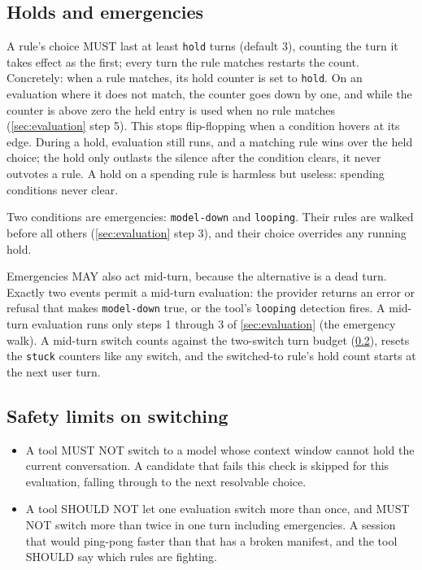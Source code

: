 \documentclass[11pt]{article}
\newcommand{\key}[1]{\texttt{#1}}
\begin{document}
\subsection{Holds and emergencies}
\label{sec:holds}

A rule's choice MUST last at least \key{hold} turns (default 3),
counting the turn it takes effect as the first; every turn the rule
matches restarts the count. Concretely: when a rule matches, its hold
counter is set to \key{hold}. On an evaluation where it does not match,
the counter goes down by one, and while the counter is above zero the
held entry is used when no rule matches (\ref{sec:evaluation} step 5).
This stops flip-flopping when a condition hovers at its edge. During a
hold, evaluation still runs, and a matching rule wins over the held
choice; the hold only outlasts the silence after the condition clears,
it never outvotes a rule. A hold on a spending rule is harmless but
useless: spending conditions never clear.

Two conditions are emergencies: \key{model-down} and \key{looping}.
Their rules are walked before all others (\ref{sec:evaluation} step 3),
and their choice overrides any running hold.

Emergencies MAY also act mid-turn, because the alternative is a dead
turn. Exactly two events permit a mid-turn evaluation: the provider
returns an error or refusal that makes \key{model-down} true, or the
tool's \key{looping} detection fires. A mid-turn evaluation runs only
steps 1 through 3 of \ref{sec:evaluation} (the emergency walk). A
mid-turn switch counts against the two-switch turn budget
(\ref{sec:safety}), resets the \key{stuck} counters like any switch,
and the switched-to rule's hold count starts at the next user turn.

\subsection{Safety limits on switching}
\label{sec:safety}

\begin{itemize}
  \item A tool MUST NOT switch to a model whose context window cannot hold
        the current conversation. A candidate that fails this check is
        skipped for this evaluation, falling through to the next resolvable
        choice.
  \item A tool SHOULD NOT let one evaluation switch more than once, and MUST
        NOT switch more than twice in one turn including emergencies. A
        session that would ping-pong faster than that has a broken manifest,
        and the tool SHOULD say which rules are fighting.
\end{itemize}
\end{document}
